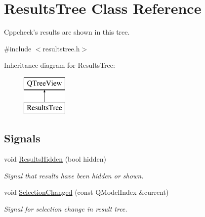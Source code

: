 \hypertarget{class_results_tree}{\section{Results\-Tree Class Reference}
\label{class_results_tree}
}


Cppcheck's results are shown in this tree.  




{\ttfamily \#include $<$resultstree.\-h$>$}

Inheritance diagram for Results\-Tree\-:\begin{figure}[H]
\begin{center}
\leavevmode
\includegraphics[height=2.000000cm]{class_results_tree}
\end{center}
\end{figure}
\subsection*{Signals}
\begin{DoxyCompactItemize}
\item 
void \hyperlink{class_results_tree_a925b10c78c1d2bc8113243a3a15785fe}{Results\-Hidden} (bool hidden)
\begin{DoxyCompactList}\small\item\em Signal that results have been hidden or shown. \end{DoxyCompactList}\item 
void \hyperlink{class_results_tree_afd7749c517764aaec5b4748b6561e934}{Selection\-Changed} (const Q\-Model\-Index \&current)
\begin{DoxyCompactList}\small\item\em Signal for selection change in result tree. \end{DoxyCompactList}\end{DoxyCompactItemize}
